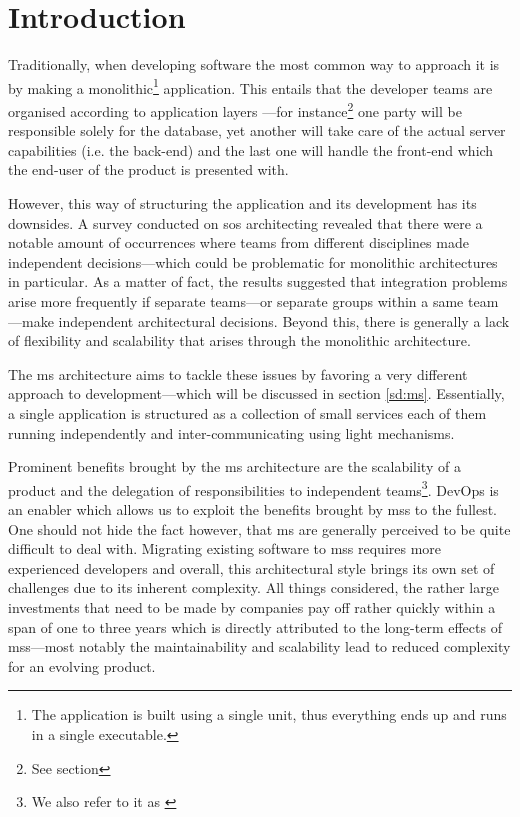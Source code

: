 \section{Introduction}%

Traditionally, when developing software the most common way to
approach it is by making a monolithic\footnote{The application is
built using a single unit, thus everything ends up and runs in a
single executable.} application.
\cite{ms-challenges} This entails that the developer teams are
organised according to application layers
\cite{ms-definition,ms-challenges}---for instance\footnote{See section
} one party will be responsible
solely for the database, yet another will take care of the actual
server capabilities (i.e. the back-end) and the last one will handle
the front-end which the end-user of the product is presented with.

However, this way of structuring the application and its development
has its downsides. A survey conducted on \gls{sos} architecting
\cite{sos-survey} revealed that there were a notable amount of
occurrences where teams from different disciplines made independent
decisions---which could be problematic for monolithic architectures in
particular. As a matter of fact, the results suggested that
integration problems arise more frequently if separate teams---or
separate groups within a same team---make
independent architectural decisions. \cite{sos-survey} Beyond this,
there is generally a lack of flexibility and scalability that arises
through the monolithic architecture. \cite{ms-challenges}

The \gls{ms} architecture aims to tackle these issues
\cite{ms-challenges} by favoring a very different approach to
development---which will be discussed in section \ref{sd:ms}.
Essentially, a single application is structured as a collection of small services
each of them running independently and inter-communicating using light
mechanisms.  \cite{ms-arch-study}

Prominent benefits brought by the \gls{ms} architecture are the
scalability of a product and the delegation of responsibilities to
independent teams\footnote{We also refer to it as
 \cite{ms-definition}}. \cite{ms-migration}
DevOps is an enabler which allows us to exploit
the benefits brought by \glspl{ms} to the fullest.
One should not hide the fact however,
that \gls{ms} are generally perceived to be quite difficult to deal
with. Migrating existing software to \glspl{ms} requires more
experienced developers and overall, this architectural style brings
its own set of challenges due to its inherent complexity.
\cite{ms-pains-gains} All things considered, the rather large
investments that need to be made by companies pay off rather quickly
within a span of one to three years which is directly attributed to
the long-term effects of \glspl{ms}---most notably the maintainability
and scalability lead to reduced complexity for an evolving product.
\cite{ms-migration}

